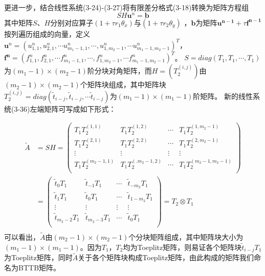 \documentclass[twoside,UTF8]{nputhesis}
\begin{document}
更进一步，结合线性系统(3-24)-(3-27)将有限差分格式(3-18)转换为矩阵方程组
\begin{equation}
SH{\bm{u}^{n}}=\bm{b}
\end{equation}
其中矩阵$S$、$H$分别对应算子$(1+\tau r_{1} {{\theta }_{x}})$与$(1+\tau r_{2} {{\theta }_{y}})$ ，$\bm{b}$为矩阵$\bm{{\bm{u}}^{n-1}}+\tau \bm{{\bm{f}}^{n-1}}$按列遍历组成的向量，定义${{\bm{u}}^{n}}={{(u_{1,1}^{n},u_{2,1}^{n},\cdots u_{{{m}_{1}}-1,1}^{n},\cdots ,u_{1,{{m}_{2}}-1}^{n},\cdots u_{{{m}_{1}}-1,{{m}_{2}}-1}^{n})}^{T}}$，\\
$\bm{{\bm{f}}^{n}}={{(f_{1,1}^{n},f_{2,1}^{n},\cdots f_{{{m}_{1}}-1,1}^{n},\cdots ,f_{1,{{m}_{2}}-1}^{n},\cdots f_{{{m}_{1}}-1,{{m}_{2}}-1}^{n})}^{T}}$。
$S=diag({{T}_{1}},{{T}_{1}},\cdots ,{{T}_{1}})$为$({{m}_{1}}-1)\times({{m}_{2}}-1)$阶分块对角矩阵，而$H=(T_{2}^{(i,j)})$由$({{m}_{2}}-1)\times({{m}_{2}}-1)$个矩阵块组成，其中矩阵块$T_{2}^{(i,j)}=diag({{\tilde{t}}_{i-j}},{{\tilde{t}}_{i-j}},\cdots {{\tilde{t}}_{i-j}})$为$({{m}_{1}}-1)\times({{m}_{1}}-1)$阶矩阵。
新的线性系统(3-36)左端矩阵可写成如下形式：

\begin{equation}
\begin{split}
\tilde{A}&=SH=\left( \begin{matrix}
{{T}_{1}}T_{2}^{(1,1)} & {{T}_{1}}T_{2}^{(1,2)} & \cdots  & {{T}_{1}}T_{2}^{(1,{{m}_{2}}-1)}  \\
{{T}_{1}}T_{2}^{(2,1)} & {{T}_{1}}T_{2}^{(2,2)} & \cdots  & {{T}_{1}}T_{2}^{(2,{{m}_{2}}-1)}  \\
\vdots  & \vdots  & \vdots  & \vdots   \\
{{T}_{1}}T_{2}^{({{m}_{2}}-1,1)} & {{T}_{1}}T_{2}^{(.{{m}_{2}}-1,2)} & \cdots  & {{T}_{1}}T_{2}^{({{m}_{2}}-1,{{m}_{2}}-1)}  \\
\end{matrix} \right) \\
& =\left( \begin{matrix}
{{{\tilde{t}}}_{0}}{{T}_{1}} & {{{\tilde{t}}}_{-1}}{{T}_{1}} & \cdots  & {{{\tilde{t}}}_{-{{m}_{2}}}}{{T}_{1}}  \\
{{{\tilde{t}}}_{1}}{{T}_{1}} & {{{\tilde{t}}}_{0}}{{T}_{1}} & \cdots  & {{{\tilde{t}}}_{1-{{m}_{2}}}}{{T}_{1}}  \\
\vdots  & \vdots  & \vdots  & \vdots   \\
{{{\tilde{t}}}_{{{m}_{2}}-2}}{{T}_{1}} & {{{\tilde{t}}}_{{{m}_{2}}-3}}{{T}_{1}} & \cdots  & {{{\tilde{t}}}_{0}}{{T}_{1}}  \\
\end{matrix} \right)={{T}_{2}}\otimes {{T}_{1}} \\
\end{split}
\end{equation}
可以看出，$\tilde{A}$由$({{m}_{2}}-1)\times({{m}_{2}}-1)$个分块矩阵组成，其中矩阵块大小为$({{m}_{1}}-1)\times({{m}_{1}}-1)$。因为${{T}_{1}}$，${{T}_{2}}$均为Toeplitz矩阵，则易证各个矩阵块${{\tilde{t}}_{i-j}}{{T}_{1}}$为Toeplitz矩阵，同时$\tilde{A}$关于各个矩阵块构成Toeplitz矩阵，由此构成的矩阵我们命名为BTTB矩阵。
\end{document}
